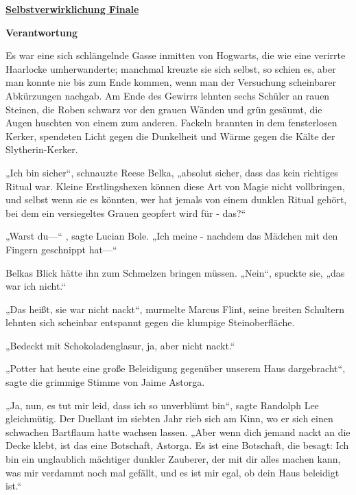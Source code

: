 

\hypertarget{selbstverwirklichung-finale}{%

\textbf{\uline{Selbstverwirklichung Finale}}

\textbf{Verantwortung}

Es war eine sich schlängelnde Gasse inmitten von Hogwarts, die wie eine verirrte Haarlocke umherwanderte; manchmal kreuzte sie sich selbst, so schien es, aber man konnte nie bis zum Ende kommen, wenn man der Versuchung scheinbarer Abkürzungen nachgab. Am Ende des Gewirrs lehnten sechs Schüler an rauen Steinen, die Roben schwarz vor den grauen Wänden und grün gesäumt, die Augen huschten von einem zum anderen. Fackeln brannten in dem fensterlosen Kerker, spendeten Licht gegen die Dunkelheit und Wärme gegen die Kälte der Slytherin-Kerker.

„Ich bin sicher“, schnauzte Reese Belka, „absolut sicher, dass das kein richtiges Ritual war. Kleine Erstlingshexen können diese Art von Magie nicht vollbringen, und selbst wenn sie es könnten, wer hat jemals von einem dunklen Ritual gehört, bei dem ein versiegeltes Grauen geopfert wird für - das?“

„Warst du—“ , sagte Lucian Bole. „Ich meine - nachdem das Mädchen mit den Fingern geschnippt hat—“

Belkas Blick hätte ihn zum Schmelzen bringen müssen. „Nein“, spuckte sie, „das war ich nicht.“

„Das heißt, sie war nicht nackt“, murmelte Marcus Flint, seine breiten Schultern lehnten sich scheinbar entspannt gegen die klumpige Steinoberfläche.

„Bedeckt mit Schokoladenglasur, ja, aber nicht nackt.“

„Potter hat heute eine große Beleidigung gegenüber unserem Haus dargebracht“, sagte die grimmige Stimme von Jaime Astorga.

„Ja, nun, es tut mir leid, dass ich so unverblümt bin“, sagte Randolph Lee gleichmütig. Der Duellant im siebten Jahr rieb sich am Kinn, wo er sich einen schwachen Bartflaum hatte wachsen lassen. „Aber wenn dich jemand nackt an die Decke klebt, ist das eine Botschaft, Astorga. Es ist eine Botschaft, die besagt: Ich bin ein unglaublich mächtiger dunkler Zauberer, der mit dir alles machen kann, was mir verdammt noch mal gefällt, und es ist mir egal, ob dein Haus beleidigt ist.“

}
